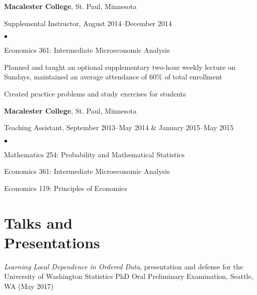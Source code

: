 \documentclass[margin,centered]{res}
\newenvironment{list1}{
  \begin{list}{\ding{113}}{%
      \setlength{\itemsep}{0in}
      \setlength{\parsep}{0in} \setlength{\parskip}{0in}
      \setlength{\topsep}{0in} \setlength{\partopsep}{0in}
      \setlength{\leftmargin}{0.17in}}}{\end{list}}
\newenvironment{list2}{
  \begin{list}{$\bullet$}{%
      \setlength{\itemsep}{0in}
      \setlength{\parsep}{0in} \setlength{\parskip}{0in}
      \setlength{\topsep}{0in} \setlength{\partopsep}{0in}
      \setlength{\leftmargin}{0.2in}}}{\end{list}}
\begin{document}
\begin{resume}
{\bf Macalester College}, St. Paul, Minnesota
\begin{list1}
\item[] Supplemental Instructor, August 2014--December 2014
\begin{list2}
\vspace*{.05in}
\item Economics 361: Intermediate Microeconomic Analysis
\item Planned and taught an optional supplementary two-hour weekly lecture on Sundays, maintained an average attendance of 60\% of total enrollment
\item Created practice problems and study exercises for students
\end{list2}
\end{list1}

{\bf Macalester College}, St. Paul, Minnesota
\begin{list1}
\item[] Teaching Assistant, September 2013--May 2014 \& January 2015--May 2015
\begin{list2}
\vspace*{.05in}
\item Mathematics 254: Probability and Mathematical Statistics
\item Economics 361: Intermediate Microeconomic Analysis
\item Economics 119: Principles of Economics
\end{list2}
\end{list1}




\section{\sc Talks and \\ Presentations}
\emph{Learning Local Dependence in Ordered Data}, presentation and defense for the University of Washington Statistics PhD Oral Preliminary Examination, Seattle, WA (May 2017)


\end{resume}
\end{document}
